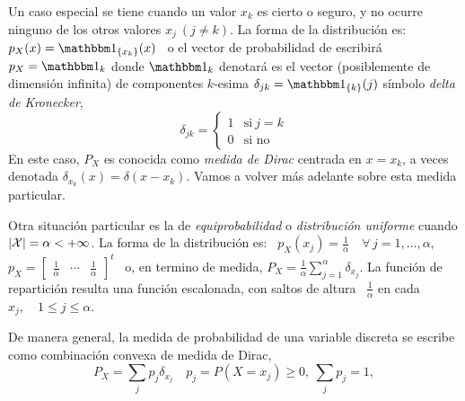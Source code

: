 \begin{figure}[h!]
\begin{center}  \end{center}
%
\label{fig:MP:ProbaDiscreta}
\end{figure}

Un caso especial se tiene cuando un  valor $x_k$ es cierto o seguro, y no ocurre
ninguno de los  otros valores $x_j \  (j \ne k)$. La forma  de la distribuci\'on
es: \ $p_X(x) = \un_{\{ x_k \}}(x)$ \ o el vector de probabilidad de escribir\'a
\  $p_X  =  \un_k$  donde  $\un_k$  denotar\'a es  el  vector  (posiblemente  de
dimensi\'on  infinita) de componentes  $k$-esima $\delta_{jk}  = \un_{\{k\}}(j)$
s\'imbolo \emph{delta de Kronecker},
%
\[
\delta_{jk} = 
\left\{
\begin{array}{clr}
1 & \mbox{si} \: j = k \\
0 & \mbox{si no}
\end{array} \right.
\]
%
En este  caso, $P_X$ es  conocida como  {\it medida de  Dirac} centrada en  $x =
x_k$, a veces  denotada $\delta_{x_k}(x) = \delta(x-x_k)$. Vamos  a volver m\'as
adelante sobre esta medida particular.

Otra   situaci\'on  particular   es  la   de  {\it   equiprobabilidad}   o  {\it
  distribuci\'on uniforme}  cuando $|\mathcal{X}|  = \alpha <  +\infty$.  La forma  de la
distribuci\'on es: \ $p_X(x_j) = \frac1\alpha \quad  \forall \, j = 1 , \ldots ,
\alpha$,    \ie   $p_X    =    \begin{bmatrix}   \frac1\alpha    &   \cdots    &
  \frac1\alpha \end{bmatrix}^t$ \  o, en termino de medida,  $P_X = \frac1\alpha
\sum_{j=1}^\alpha  \delta_{x_j}$.   La funci\'on  de  repartici\'on resulta  una
funci\'on escalonada, con saltos de  altura \ $\frac1\alpha$ en cada $x_j, \quad
1 \le j \le \alpha$.

De manera general, la medida de probabilidad de una variable discreta se escribe
como combinaci\'on convexa de medida de Dirac,
%
\[
P_X = \sum_j p_j \delta_{x_j} \quad p_j = P(X=x_j) \ge 0, \: \sum_j p_j = 1, 
\]

